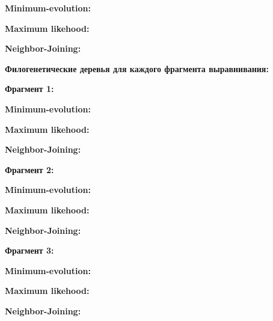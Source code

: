 \documentclass{article} %
\begin{document}
\textbf{Minimum-evolution:}

\textbf{Maximum likehood:}

\textbf{Neighbor-Joining:}

\begin{figure}[h]
	
\end{figure}

\textbf{Филогенетические деревья для каждого фрагмента \mbox{выравнивания}:}

\textbf{Фрагмент 1:}

\textbf{Minimum-evolution:}

\textbf{Maximum likehood:}

\textbf{Neighbor-Joining:}


\textbf{Фрагмент 2:}

\textbf{Minimum-evolution:}

\textbf{Maximum likehood:}

\textbf{Neighbor-Joining:}


\textbf{Фрагмент 3:}

\textbf{Minimum-evolution:}

\textbf{Maximum likehood:}

\textbf{Neighbor-Joining:}
\end{document}
